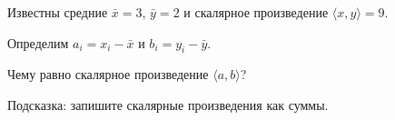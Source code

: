 
\begin{question}
Известны средние \(\bar x = 3\), \(\bar y =2\) и скалярное произведение \(\langle x, y\rangle = 9\).

Определим \(a_i = x_i - \bar x\) и \(b_i = y_i - \bar y\).

Чему равно скалярное произведение \(\langle a, b\rangle\)?
\end{question}

\begin{solution}
Подсказка: запишите скалярные произведения как суммы.
\end{solution}

